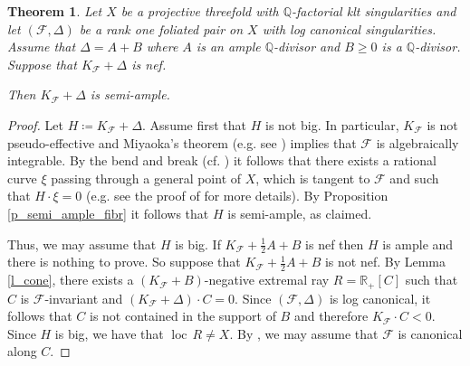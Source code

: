 \documentclass[12pt]{amsart}
\newtheorem{theorem}{Theorem}[section]
\newcommand{\bb}[1]{\mathbb{#1}}
\newcommand{\loc}[1]{\operatorname{loc} \, #1}
\newcommand{\cal}[1]{\mathcal{#1}}
\begin{document}
\begin{theorem}\label{t_bpf}
Let $X$ be a  projective threefold with $\mathbb Q$-factorial klt singularities 
and let $(\cal F,\Delta)$ be a rank one  foliated  pair on $X$ with log canonical singularities. Assume that  $\Delta=A+B$ where $A$ is an ample $\bb Q$-divisor and $B\ge 0$ is a $\bb Q$-divisor. 
Suppose that $K_{\cal F}+\Delta$ is nef.  

Then $K_{\cal F}+\Delta$ is semi-ample.
\end{theorem}
\begin{proof} Let $H\coloneq K_{\cal F}+\Delta$. 
Assume first that $H$ is not big. In particular,  $K_{\cal F}$ is not pseudo-effective and  
Miyaoka's theorem (e.g. see \cite[Theorem 7.1]{brunella00}) implies that $\mathcal F$ is algebraically integrable. 
 By the bend and break (cf. \cite[Corollary 2.28] {Spicer20}) it follows that there exists a rational curve $\xi$ passing through a general point of $X$,  which is tangent to $\cal F$ and such that $H\cdot \xi=0$ (e.g. see the proof of \cite[Theorem 6.3]{Spicer20} for more details). 
By Proposition \ref{p_semi_ample_fibr} it follows that $H$ is semi-ample, as claimed.

\medskip 

Thus, we may assume that $H$ is big.  If $K_{\cal F}+\frac{1}{2}A+B$ is nef then $H$ is ample and there is nothing to prove.   So suppose that $K_{\cal F}+\frac{1}{2}A+B$ is not nef. By Lemma \ref{l_cone},  there exists a  $(K_{\cal F}+B)$-negative extremal ray $R=\mathbb R_+[C]$  such that $C$ is $\cal F$-invariant and  $(K_{\cal F}+\Delta)\cdot C=0$. Since $(\cal F,\Delta)$ is log canonical, it follows that $C$ is not contained in the support of $B$ and therefore $K_{\cal F}\cdot C<0$. Since $H$ is big, we have that  $\loc R\neq X$. 
By \cite[Corollary 8.5]{CS20}, we may  assume that $\cal F$ is canonical along $C$. 


\end{proof}
\end{document}
